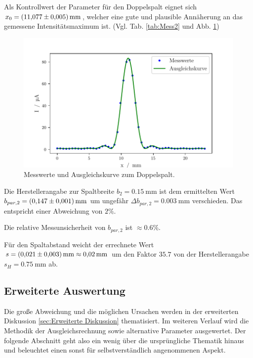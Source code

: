 Als Kontrollwert der Parameter für den Doppelspalt eignet sich $x_0 = \SI{11.077 \pm 0.005}{\milli\meter}$, welcher eine gute und plausible Annäherung an das gemessene Intensitätsmaximum ist. (Vgl. Tab. \ref{tab:Mess2} und Abb. \ref{fig:messDoppel})
\begin{figure}
    \centering
    \includegraphics[width=.9\textwidth]{python/DoppelspaltFit.pdf}
    \caption{Messwerte und Ausgleichskurve zum Doppelspalt.}
    \label{fig:messDoppel}
\end{figure}

Die Herstellerangabe zur Spaltbreite $b_2 = \SI{0.15}{\milli\meter}$ ist dem ermittelten Wert $b_{par, 2} = \SI{0.147 \pm 0.001}{\milli\meter}$
um ungefähr $\Delta b_{par, 2} = \SI{0.003}{\milli\meter}$ verschieden. Das entspricht einer Abweichung von $2\%$.

Die relative Messunsicherheit von $b_{par, 2}$ ist $\approx 0.6\%$.

Für den Spaltabstand weicht der errechnete Wert $s = \SI{0.021 \pm 0.003}{\milli\meter} \approx \SI{0.02}{\milli\meter}$ um den Faktor $35.7$ von der Herstellerangabe $s_H = \SI{0.75}{\milli\meter}$ ab.

\subsection{Erweiterte Auswertung}
Die große Abweichung und die möglichen Ursachen werden in der erweiterten Diskussion \ref{sec:Erweiterte Diskussion} thematisiert.
Im weiteren Verlauf wird die Methodik der Ausgleichsrechnung sowie alternative Parameter ausgewertet. Der folgende Abschnitt geht also ein wenig über die ursprüngliche
Thematik hinaus und beleuchtet einen sonst für selbstverständlich angenommenen Aspekt.\\


